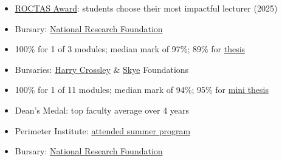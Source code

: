 
\begin{itemize}
	\item
	\href{http://www.sun.ac.za/english/learning-teaching/ctl/t-l-awards-and-grants/roctas}{ROCTAS
		Award}: students choose their most impactful lecturer (2025)
	\item Bursary: \href{https://www.nrf.ac.za/}{National Research Foundation}
\end{itemize}

\begin{itemize}
    \item 100\% for 1 of 3 modules; median mark of 97\%; 89\% for
		\href{https://doi.org/10019.1/126944}{thesis}
    \item Bursaries: \href{https://thecrossleyfoundation.co.za/}{Harry Crossley}
		\& \href{http://skyefoundation.co.za/awards/awards-by-year/}{Skye} Foundations
\end{itemize}

\begin{itemize}
    \item 100\% for 1 of 11 modules; median mark of 94\%; 95\% for
		\href{https://doi.org/10.5281/zenodo.8414170}{mini thesis}
    \item Dean's Medal: top faculty average over 4 years
    \item Perimeter Institute:
		\href{https://dariotrinchero.github.io/files/pi_cert.pdf}{attended summer program}
    \item Bursary: \href{https://www.nrf.ac.za/}{National Research Foundation}
\end{itemize}

\newcommand{\topcsfirstyear}{%
    \item Top Computer Science \& \href{https://appliedmaths.sun.ac.za/topachievers.html}{Applied Mathematics}
		first year}
\newcommand{\teamcontests}{%
    \item Team contests (2018): 1st in \href{https://appliedmaths.sun.ac.za/sammc.html}%
		{South African Mathematical Modelling Contest}; 2nd in \href{https://www.csc.ac.za/?page_id=665}%
		{\emph{SANReN} Cyber Security Challenge}}

